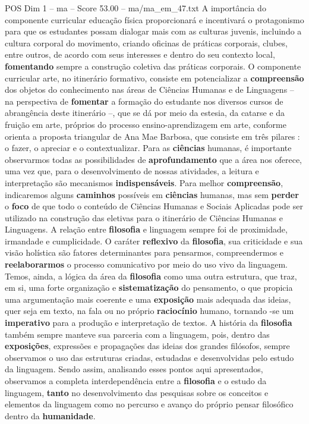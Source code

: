\begin{textsample}{POS Dim 1 – ma – Score 53.00 – ma/ma\_em\_47.txt}
A importância do componente curricular educação física proporcionará e incentivará o protagonismo para que os estudantes possam dialogar mais com as culturas juvenis, incluindo a cultura corporal do movimento, criando oficinas de práticas corporais, clubes, entre outros, de acordo com seus interesses e dentro do seu contexto local, \textbf{fomentando} sempre a construção coletiva das práticas corporais.
O componente curricular arte, no itinerário formativo, consiste em potencializar a \textbf{compreensão} dos objetos do conhecimento nas áreas de Ciências Humanas e de Linguagens – na perspectiva de \textbf{fomentar} a formação do estudante nos diversos cursos de abrangência deste itinerário –, que se dá por meio da estesia, da catarse e da fruição em arte, próprios do processo ensino-aprendizagem em arte, conforme orienta a proposta triangular de Ana Mae Barbosa, que consiste em três pilares : o fazer, o apreciar e o contextualizar.
Para as \textbf{ciências} humanas, é importante observarmos todas as possibilidades de \textbf{aprofundamento} que a área nos oferece, uma vez que, para o desenvolvimento de nossas atividades, a leitura e interpretação são mecanismos \textbf{indispensáveis}.
Para melhor \textbf{compreensão}, indicaremos alguns \textbf{caminhos} possíveis em \textbf{ciências} humanas, mas sem \textbf{perder} o \textbf{foco} de que todo o conteúdo de Ciências Humanas e Sociais Aplicadas pode ser utilizado na construção das eletivas para o itinerário de Ciências Humanas e Linguagens.
A relação entre \textbf{filosofia} e linguagem sempre foi de proximidade, irmandade e cumplicidade.
O caráter \textbf{reflexivo} da \textbf{filosofia}, sua criticidade e sua visão holística são fatores determinantes para pensarmos, compreendermos e \textbf{reelaborarmos} o processo comunicativo por meio do uso vivo da linguagem.
Temos, ainda, a lógica da área da \textbf{filosofia} como uma outra estrutura, que traz, em si, uma forte organização e \textbf{sistematização} do pensamento, o que propicia uma argumentação mais coerente e uma \textbf{exposição} mais adequada das ideias, quer seja em texto, na fala ou no próprio \textbf{raciocínio} humano, tornando -se um \textbf{imperativo} para a produção e interpretação de textos.
A história da \textbf{filosofia} também sempre manteve sua parceria com a linguagem, pois, dentro das \textbf{exposições}, expressões e propagações das ideias dos grandes filósofos, sempre observamos o uso das estruturas criadas, estudadas e desenvolvidas pelo estudo da linguagem.
Sendo assim, analisando esses pontos aqui apresentados, observamos a completa interdependência entre a \textbf{filosofia} e o estudo da linguagem, \textbf{tanto} no desenvolvimento das pesquisas sobre os conceitos e elementos da linguagem como no percurso e avanço do próprio pensar filosófico dentro da \textbf{humanidade}.

\end{textsample}
